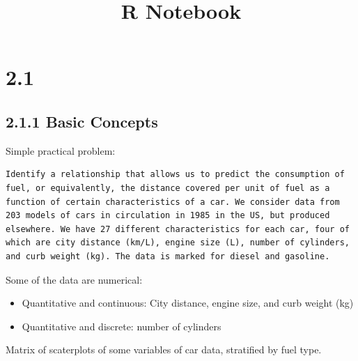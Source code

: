 \documentclass[]{article}
\title{R Notebook}
\author{}
\date{\vspace{-2.5em}}
\providecommand{\tightlist}{%
  \setlength{\itemsep}{0pt}\setlength{\parskip}{0pt}}
\begin{document}
\maketitle

\section{2.1}\label{section}

\subsection{2.1.1 Basic Concepts}\label{basic-concepts}

Simple practical problem:

\begin{verbatim}
Identify a relationship that allows us to predict the consumption of fuel, or equivalently, the distance covered per unit of fuel as a function of certain characteristics of a car. We consider data from 203 models of cars in circulation in 1985 in the US, but produced elsewhere. We have 27 different characteristics for each car, four of which are city distance (km/L), engine size (L), number of cylinders, and curb weight (kg). The data is marked for diesel and gasoline.
\end{verbatim}

Some of the data are numerical:

\begin{itemize}
\tightlist
\item
  Quantitative and continuous: City distance, engine size, and curb
  weight (kg)
\item
  Quantitative and discrete: number of cylinders
\end{itemize}

Matrix of scaterplots of some variables of car data, stratified by fuel
type.
\end{document}
